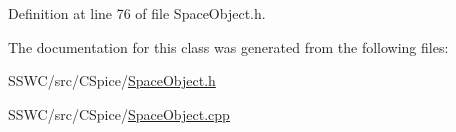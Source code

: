 Definition at line 76 of file Space\+Object.\+h.



The documentation for this class was generated from the following files\+:\begin{DoxyCompactItemize}
\item 
S\+S\+W\+C/src/\+C\+Spice/\hyperlink{_space_object_8h}{Space\+Object.\+h}\item 
S\+S\+W\+C/src/\+C\+Spice/\hyperlink{_space_object_8cpp}{Space\+Object.\+cpp}\end{DoxyCompactItemize}
